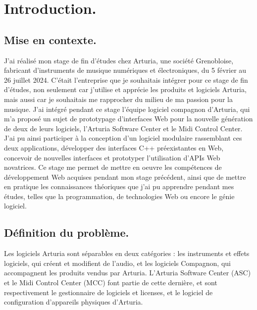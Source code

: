 \documentclass[francais]{rapportPFE}  %
\begin{document}



     
     
     
\section{Introduction.}

\subsection{Mise en contexte.}
J'ai réalisé mon stage de fin d'études chez Arturia, une société Grenobloise, fabricant d'instruments de musique numériques et électroniques, du 5 février au 26 juillet 2024. C'était l'entreprise que je souhaitais intégrer pour ce stage de fin d'études, non seulement car j'utilise et apprécie les produits et logiciels Arturia, mais aussi car je souhaitais me rapprocher du milieu de ma passion pour la musique. 
J'ai intégré pendant ce stage l'équipe logiciel compagnon d'Arturia, qui m'a proposé un sujet de prototypage d'interfaces Web pour la nouvelle génération de deux de leurs logiciels, l'Arturia Software Center et le Midi Control Center. J'ai pu ainsi participer à la conception d'un logiciel modulaire rassemblant ces deux applications, développer des interfaces C++ préexistantes en Web, concevoir de nouvelles interfaces et prototyper l'utilisation d'APIs Web novatrices. Ce stage me permet de mettre en oeuvre les compétences de développement Web acquises pendant mon stage précédent, ainsi que de mettre en pratique les connaissances théoriques que j'ai pu apprendre pendant mes études, telles que la programmation, de technologies Web ou encore le génie logiciel.
\subsection{Définition du problème.}

Les logiciels Arturia sont séparables en deux catégories : les instruments et effets logiciels, qui créent et modifient de l'audio, et les logiciels Compagnon, qui accompagnent les produits vendus par Arturia.
L'Arturia Software Center (ASC) et le Midi Control Center (MCC) font partie de cette dernière, et sont respectivement le gestionnaire de logiciels et licenses, et le logiciel de configuration d'appareils physiques d'Arturia.
\end{document}
